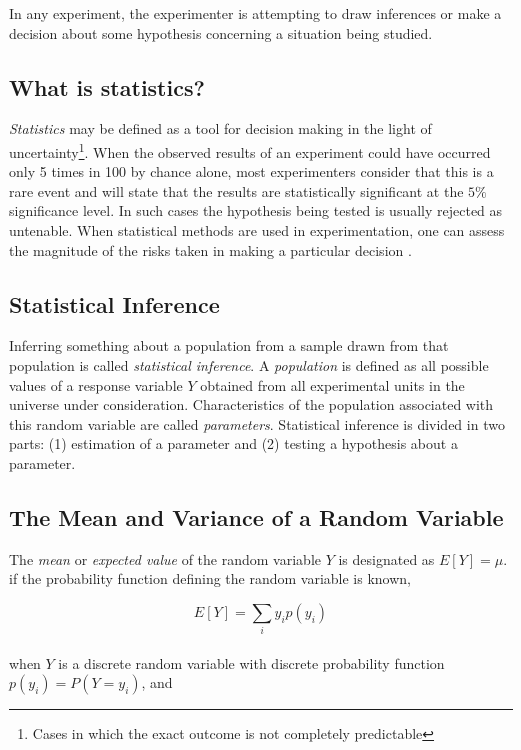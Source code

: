 \documentclass{WileySev}
\begin{document}
In any experiment, the experimenter is attempting to draw inferences or make a decision about some hypothesis concerning a situation being studied.

\subsection{What is statistics?}

\textit{Statistics} may be defined as a tool for decision making in the light of uncertainty\footnote{Cases in which the exact outcome is not completely predictable}. When the observed results of an experiment could have occurred only 5 times in 100 by chance alone, most experimenters consider that this is a rare event and will state that the results are statistically significant at the $5\%$ significance level. In such cases the hypothesis being tested is usually rejected as untenable. When statistical methods are used in experimentation, one can assess the magnitude of the risks taken in making a particular decision \cite{hicks1999fundamental}.

\subsection{Statistical Inference}

Inferring something about a population from a sample drawn from that population is called \textit{statistical inference}. A \textit{population} is defined as all possible values of a response variable $Y$ obtained from all experimental units in the universe under consideration. Characteristics of the population associated with this random variable are called \textit{parameters}. Statistical inference is divided in two parts: (1) estimation of a parameter and (2) testing a hypothesis about a parameter.

\subsection{The Mean and Variance of a Random Variable}

The \textit{mean} or \textit{expected value} of the random variable $Y$ is designated as $E[Y]=\mu$. if the probability function defining the random variable is known,

\begin{equation}
E[Y]=\sum_iy_ip(y_i)
\end{equation}
\\
when $Y$ is a discrete random variable with discrete probability function $p(y_i)=P(Y=y_i)$, and
\end{document}
